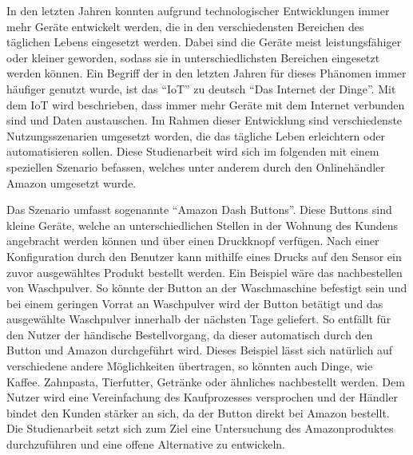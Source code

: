 In den letzten Jahren konnten aufgrund technologischer Entwicklungen immer mehr Geräte entwickelt werden, die in den verschiedensten Bereichen des täglichen Lebens eingesetzt werden. Dabei sind die Geräte meist leistungsfähiger oder kleiner geworden, sodass sie in unterschiedlichsten Bereichen eingesetzt werden können. Ein Begriff der in den letzten Jahren für dieses Phänomen immer häufiger genutzt wurde, ist das ``\ac{IoT}'' zu deutsch ``Das Internet der Dinge''. Mit dem \ac{IoT} wird beschrieben, dass immer mehr Geräte mit dem Internet verbunden sind und Daten austauschen. Im Rahmen dieser Entwicklung sind verschiedenste Nutzungsszenarien umgesetzt worden, die das tägliche Leben erleichtern oder automatisieren sollen. Diese Studienarbeit wird sich im folgenden mit einem speziellen Szenario befassen, welches unter anderem durch den Onlinehändler Amazon umgesetzt wurde.

Das Szenario umfasst sogenannte ``Amazon Dash Buttons''. Diese Buttons sind kleine Geräte, welche an unterschiedlichen Stellen in der Wohnung des Kundens angebracht werden können und über einen Druckknopf verfügen. Nach einer Konfiguration durch den Benutzer kann mithilfe eines Drucks auf den Sensor ein zuvor ausgewähltes Produkt bestellt werden. Ein Beispiel wäre das nachbestellen von Waschpulver. So könnte der Button an der Waschmaschine befestigt sein und bei einem geringen Vorrat an Waschpulver wird der Button betätigt und das ausgewählte Waschpulver innerhalb der nächsten Tage geliefert. So entfällt für den Nutzer der händische Bestellvorgang, da dieser automatisch durch den Button und Amazon durchgeführt wird. Dieses Beispiel lässt sich natürlich auf verschiedene andere Möglichkeiten übertragen, so könnten auch Dinge, wie Kaffee. Zahnpasta, Tierfutter, Getränke oder ähnliches nachbestellt werden. Dem Nutzer wird eine Vereinfachung des Kaufprozesses versprochen und der Händler bindet den Kunden stärker an sich, da der Button direkt bei Amazon bestellt. 
Die Studienarbeit setzt sich zum Ziel eine Untersuchung des Amazonproduktes durchzuführen und eine offene Alternative zu entwickeln. 
